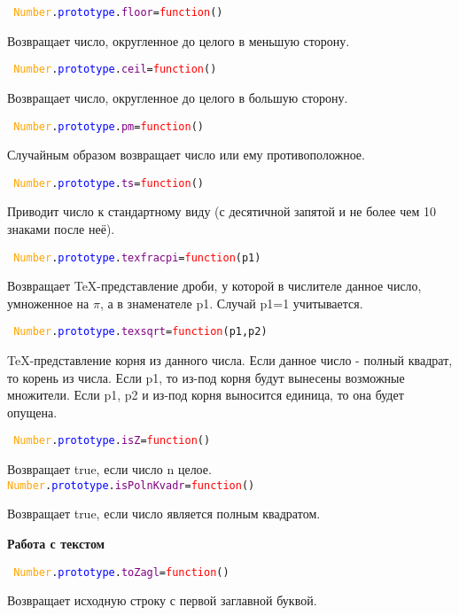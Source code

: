 \texttt{
	\textcolor{Orange}{Number}.\textcolor{Blue}{prototype}.\textcolor{Purple}{floor}=\textcolor{Red}{function}()
}

Возвращает число, округленное до целого в меньшую сторону.

\texttt{
	\textcolor{Orange}{Number}.\textcolor{Blue}{prototype}.\textcolor{Purple}{ceil}=\textcolor{Red}{function}()
}

Возвращает число, округленное до целого в большую сторону.

\texttt{
	\textcolor{Orange}{Number}.\textcolor{Blue}{prototype}.\textcolor{Purple}{pm}=\textcolor{Red}{function}()
}

Случайным образом возвращает число или ему противоположное.

\texttt{
	\textcolor{Orange}{Number}.\textcolor{Blue}{prototype}.\textcolor{Purple}{ts}=\textcolor{Red}{function}()
}

Приводит число к стандартному виду (с десятичной запятой и не более чем 10 знаками после неё).

\texttt{
	\textcolor{Orange}{Number}.\textcolor{Blue}{prototype}.\textcolor{Purple}{texfracpi}=\textcolor{Red}{function}(p1)
}

Возвращает TeX-представление дроби, у которой в числителе данное число, умноженное на $\pi$, а в знаменателе p1.
Случай p1=1 учитывается.

\texttt{
	\textcolor{Orange}{Number}.\textcolor{Blue}{prototype}.\textcolor{Purple}{texsqrt}=\textcolor{Red}{function}(p1,p2)
}

TeX-представление корня из данного числа.
Если данное число - полный квадрат, то корень из числа.
Если p1, то из-под корня будут вынесены возможные множители.
Если p1, p2 и из-под корня выносится единица, то она будет опущена.

\texttt{
	\textcolor{Orange}{Number}.\textcolor{Blue}{prototype}.\textcolor{Purple}{isZ}=\textcolor{Red}{function}()
}

Возвращает true, если число n целое.
\texttt{
	\textcolor{Orange}{Number}.\textcolor{Blue}{prototype}.\textcolor{Purple}{isPolnKvadr}=\textcolor{Red}{function}()
}

Возвращает true, если число является полным квадратом.

\textbf{Работа с текстом}

\texttt{
	\textcolor{Orange}{Number}.\textcolor{Blue}{prototype}.\textcolor{Purple}{toZagl}=\textcolor{Red}{function}()
}

Возвращает исходную строку с первой заглавной буквой.

